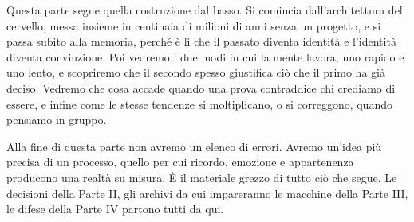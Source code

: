 Questa parte segue quella costruzione dal basso. Si comincia dall'architettura del cervello, messa insieme in centinaia di milioni di anni senza un progetto, e si passa subito alla memoria, perché è lì che il passato diventa identità e l'identità diventa convinzione. Poi vedremo i due modi in cui la mente lavora, uno rapido e uno lento, e scopriremo che il secondo spesso giustifica ciò che il primo ha già deciso. Vedremo che cosa accade quando una prova contraddice chi crediamo di essere, e infine come le stesse tendenze si moltiplicano, o si correggono, quando pensiamo in gruppo.

Alla fine di questa parte non avremo un elenco di errori. Avremo un'idea più precisa di un processo, quello per cui ricordo, emozione e appartenenza producono una realtà su misura. È il materiale grezzo di tutto ciò che segue. Le decisioni della Parte II, gli archivi da cui impareranno le macchine della Parte III, le difese della Parte IV partono tutti da qui.

\cleardoublepage
